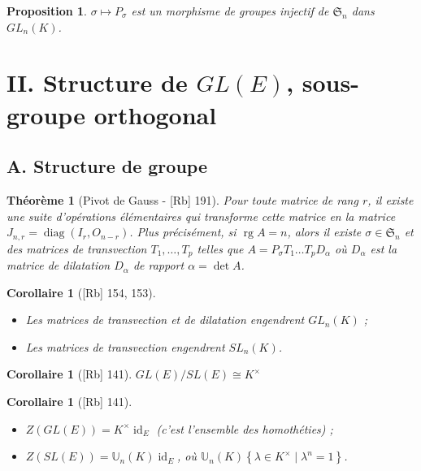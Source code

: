 \documentclass[10pt, a4paper, parskip=full, twoside, twocolumn]{report}
\newtheorem{theorem}[definition]{Théorème}
\newtheorem{proposition}[definition]{Proposition}
\newtheorem{corollary}[definition]{Corollaire}
\DeclareMathOperator{\rg}{rg}
\DeclareMathOperator{\id}{id}
\DeclareMathOperator{\diag}{diag}
\begin{document}
\begin{proposition}
	$\sigma\mapsto P_{\sigma}$ est un morphisme de groupes injectif de $\mathfrak{S}_n$ dans $GL_n(K)$.
\end{proposition}

\section*{II. Structure de $GL(E)$, sous-groupe orthogonal}
\subsection*{A. Structure de groupe}

\begin{theorem}[Pivot de Gauss - \textnormal{[Rb] 191}]
	Pour toute matrice de rang $r$, il existe une suite d'opérations élémentaires qui transforme cette matrice en la matrice $J_{n,r} = \diag(I_r, O_{n-r})$.
	Plus précisément, si $\rg A = n$, alors il existe $\sigma\in\mathfrak{S}_n$ et des matrices de transvection $T_1, \dots, T_p$ telles que $A = P_{\sigma}T_1\dots T_p D_{\alpha}$ où $D_{\alpha}$ est la matrice de dilatation $D_{\alpha}$ de rapport $\alpha = \det A$.
\end{theorem}

\begin{corollary}[\textnormal{[Rb] 154, 153}]
	\begin{itemize}
		\item Les matrices de transvection et de dilatation engendrent $GL_n(K)$ ;
		\item Les matrices de transvection engendrent $SL_n(K)$.
	\end{itemize}
\end{corollary}

\begin{corollary}[\textnormal{[Rb] 141}]
	$GL(E) / SL(E) \cong K^{\times}$
\end{corollary}

\begin{corollary}[\textnormal{[Rb] 141}]
	\begin{itemize}
		\item $Z(GL(E)) = K^{\times}\id_E$ (c'est l'ensemble des homothéties) ;
		\item $Z(SL(E)) = \mathbb{U}_n(K)\id_E$, où $\mathbb{U}_n(K)  \left\{\lambda\in K^{\times} \mid \lambda^n = 1\right\}$.
	\end{itemize}
\end{corollary}
\end{document}
